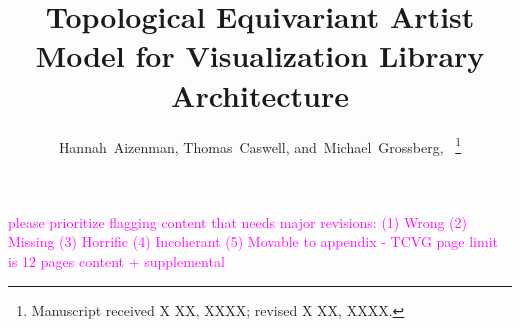 \documentclass[10pt,journal,compsoc]{IEEEtran}
\newcommand{\note}[1]{\textcolor{magenta}{#1}}
\theoremstyle{definition}
\theoremstyle{remark}
\begin{document}
\linenumbers

\title{Topological Equivariant Artist Model for Visualization Library Architecture}
\author{Hannah~Aizenman, Thomas~Caswell, and~Michael~Grossberg,~%
\thanks{Manuscript received X XX, XXXX; revised X XX, XXXX.}
}




\maketitle


\IEEEpeerreviewmaketitle




\note{please prioritize flagging content that needs major revisions: (1) Wrong (2) Missing (3) Horrific  (4) Incoherant (5) Movable to appendix - TCVG page limit is 12 pages content + supplemental}
\end{document}
